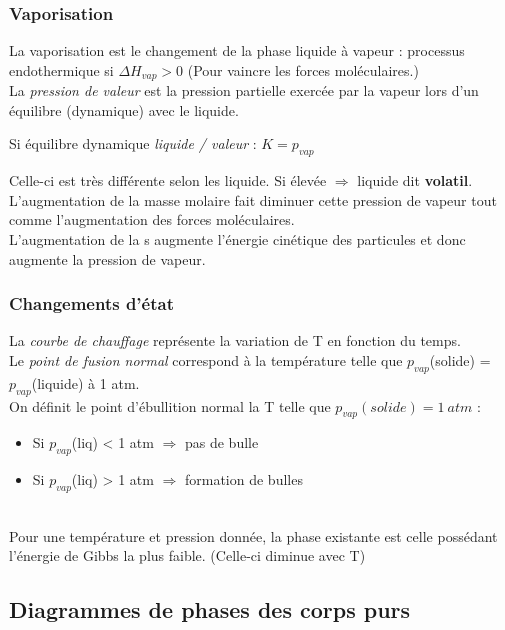 \documentclass[12pt, a4paper]{article}
\begin{document}
\subsubsection{Vaporisation}
La vaporisation est le changement de la phase liquide à vapeur : processus endothermique si $\Delta H_{vap} > 0$ (Pour vaincre les forces moléculaires.)\\
La \textit{pression de valeur} est la pression partielle exercée par la vapeur lors d'un équilibre (dynamique) avec le liquide.
\begin{center}
Si équilibre dynamique \textit{liquide / valeur} : $K = p_{vap}$
\end{center}
Celle-ci est très différente selon les liquide. Si élevée $\Rightarrow$ liquide dit \textbf{volatil}.\\
L'augmentation de la masse molaire fait diminuer cette pression de vapeur tout comme l'augmentation des forces moléculaires.\\
L'augmentation de la s augmente l'énergie cinétique des particules et donc augmente la pression de vapeur.

\subsubsection{Changements d'état}
La \textit{courbe de chauffage} représente la variation de T en fonction du temps.\\
Le \textit{point de fusion normal} correspond à la température telle que $p_{vap}$(solide) = $p_{vap}$(liquide) à 1 atm.\\
On définit le point d'ébullition normal la T telle que $p_{vap}(solide) = 1\ atm$ :
\begin{itemize}
\item Si $p_{vap}$(liq) < 1 atm $\Rightarrow$ pas de bulle
\item Si $p_{vap}$(liq) > 1 atm $\Rightarrow$ formation de bulles
\end{itemize}
\ \\
Pour une température et pression donnée, la phase existante est celle possédant l'énergie de Gibbs la plus faible. (Celle-ci diminue avec T)

\subsection{Diagrammes de phases des corps purs}
\end{document}
